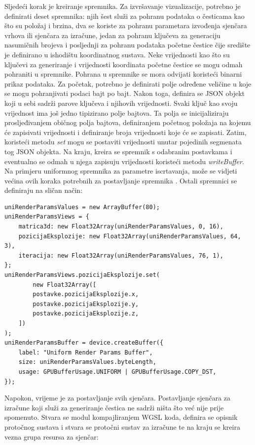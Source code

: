 \documentclass{foi}
\begin{document}
Sljedeći korak je kreiranje spremnika. Za izvršavanje vizualizacije, potrebno je definirati deset spremnika: njih šest služi za pohranu podataka o česticama kao što su položaj i brzina, dva se koriste za pohranu parametara izvođenja sjenčara vrhova ili sjenčara za izračune, jedan za pohranu ključeva za generaciju nasumičnih brojeva i posljednji za pohranu podataka početne čestice čije središte je definirano u ishodištu koordinatnog sustava. Neke vrijednosti kao što su ključevi za generiranje i vrijednosti koordinata početne čestice se mogu odmah pohraniti u spremnike. Pohrana u spremnike se mora odvijati koristeći binarni prikaz podataka. Za početak, potrebno je definirati polje određene veličine u koje se mogu pohranjivati podaci bajt po bajt. Nakon toga, definira se JSON objekt koji u sebi sadrži parove ključeva i njihovih vrijednosti. Svaki ključ kao svoju vrijednost ima još jedno tipizirano polje bajtova. Ta polja se inicijaliziraju prosljeđivanjem običnog polja bajtova, definiranjem početnog položaja na kojemu će zapisivati vrijednosti i definiranje broja vrijednosti koje će se zapisati. Zatim, koristeći metodu \textit{set} mogu se postaviti vrijednosti unutar pojedinih segmenata tog JSON objekta. Na kraju, kreira se spremnik s odabranim postavkama i eventualno se odmah u njega zapisuju vrijednosti koristeći metodu \textit{writeBuffer}. Na primjeru uniformnog spremnika za parametre iscrtavanja, može se vidjeti većina ovih koraka potrebnih za postavljanje spremnika  \parencite{WebGPUFundamentalsCopyData}. Ostali spremnici se definiraju na sličan način:
\begin{verbatim}
uniRenderParamsValues = new ArrayBuffer(80);
uniRenderParamsViews = {
	matrica3d: new Float32Array(uniRenderParamsValues, 0, 16),
	pozicijaEksplozije: new Float32Array(uniRenderParamsValues, 64, 3),
	iteracija: new Float32Array(uniRenderParamsValues, 76, 1),
};
uniRenderParamsViews.pozicijaEksplozije.set(
		new Float32Array([
		postavke.pozicijaEksplozije.x,
		postavke.pozicijaEksplozije.y,
		postavke.pozicijaEksplozije.z,
	])
);
uniRenderParamsBuffer = device.createBuffer({
	label: "Uniform Render Params Buffer",
	size: uniRenderParamsValues.byteLength,
	usage: GPUBufferUsage.UNIFORM | GPUBufferUsage.COPY_DST,
});
\end{verbatim}

Napokon, vrijeme je za postavljanje svih sjenčara. Postavljanje sjenčara za izračune koji služi za generiranje čestica ne sadrži ništa što već nije prije spomenuto. Stvara se modul kompajliranjem WGSL koda, definira se opisnik protočnog sustava i stvara se protočni sustav za izračune te na kraju se kreira vezna grupa resursa za sjenčar:
\end{document}
